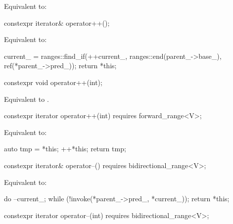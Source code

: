 \begin{itemdescr}
\pnum
\effects
Equivalent to: 
\end{itemdescr}

%
\begin{itemdecl}
constexpr iterator& operator++();
\end{itemdecl}

\begin{itemdescr}
\pnum
\effects
Equivalent to:
\begin{codeblock}
current_ = ranges::find_if(++current_, ranges::end(parent_->base_), ref(*parent_->pred_));
return *this;
\end{codeblock}
\end{itemdescr}

%
\begin{itemdecl}
constexpr void operator++(int);
\end{itemdecl}

\begin{itemdescr}
\pnum
\effects
Equivalent to .
\end{itemdescr}

%
\begin{itemdecl}
constexpr iterator operator++(int) requires forward_range<V>;
\end{itemdecl}

\begin{itemdescr}
\pnum
\effects
Equivalent to:
\begin{codeblock}
auto tmp = *this;
++*this;
return tmp;
\end{codeblock}
\end{itemdescr}

%
\begin{itemdecl}
constexpr iterator& operator--() requires bidirectional_range<V>;
\end{itemdecl}

\begin{itemdescr}
\pnum
\effects
Equivalent to:
\begin{codeblock}
do
  --current_;
while (!invoke(*parent_->pred_, *current_));
return *this;
\end{codeblock}
\end{itemdescr}

%
\begin{itemdecl}
constexpr iterator operator--(int) requires bidirectional_range<V>;
\end{itemdecl}

